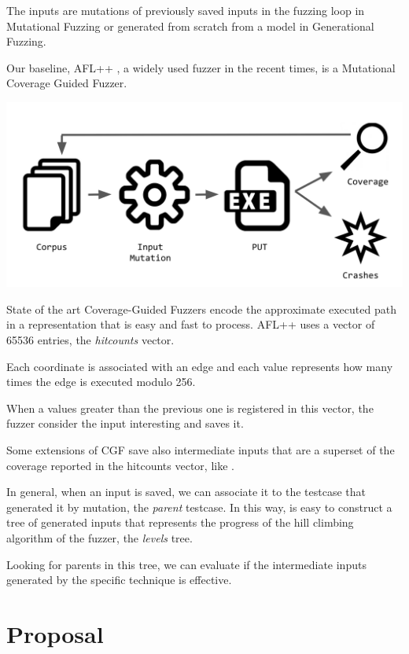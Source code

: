\documentclass[conference,compsoc]{IEEEtran}
\begin{document}
The inputs are mutations of previously saved inputs in the fuzzing loop in Mutational Fuzzing or generated from scratch from a model in Generational Fuzzing.

Our baseline, {\sc AFL++} \cite{aflplusplus}, a widely used fuzzer in the recent times, is a Mutational Coverage Guided Fuzzer.

\begin{center}
\includegraphics[scale=0.16]{cgf}
\end{center}

State of the art Coverage-Guided Fuzzers encode the approximate executed path in a representation that is easy and fast to process.
{\sc AFL++} uses a vector of 65536 entries, the {\it hitcounts} vector.

Each coordinate is associated with an edge and each value represents how many times the edge is executed modulo 256.

When a values greater than the previous one is registered in this vector, the fuzzer consider the input interesting and saves it.

Some extensions of CGF save also intermediate inputs that are a superset of the coverage reported in the hitcounts vector, like \cite{lafintel} \cite{ijon} \cite{besensitive}.

In general, when an input is saved, we can associate it to the testcase that generated it by mutation, the {\it parent} testcase. In this way, is easy to construct a tree of generated inputs that represents the progress of the hill climbing algorithm of the fuzzer, the {\it levels} tree.

Looking for parents in this tree, we can evaluate if the intermediate inputs generated by the specific technique is effective.

\section{Proposal}
\end{document}
